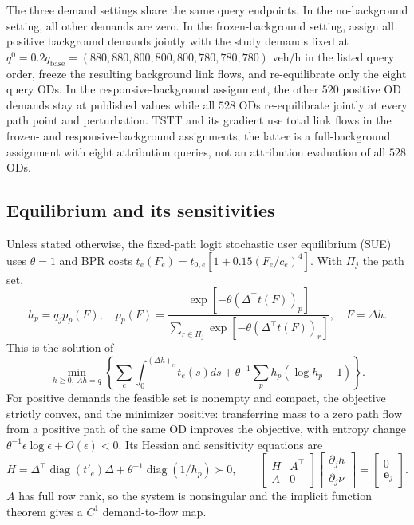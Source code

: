 The three demand settings share the same query endpoints. In the
no-background setting, all other demands are zero. In the
frozen-background setting, assign all positive
background demands jointly with the study demands fixed at
$q^0=0.2q_{\mathrm{base}}=(880,880,800,800,800,780,780,780)$ veh/h in
the listed query order, freeze the resulting background link flows, and
re-equilibrate only the eight query ODs. In the responsive-background assignment, the other $520$
positive OD demands stay at published values while all $528$ ODs
re-equilibrate jointly at every path point and perturbation. TSTT and
its gradient use total link flows in the frozen- and responsive-background assignments; the latter is a
full-background assignment with eight attribution queries, not an
attribution evaluation of all $528$ ODs.

\subsection{Equilibrium and its sensitivities}\label{supp:sue}
Unless stated otherwise, the fixed-path logit stochastic user equilibrium
(SUE) uses $\theta=1$ and BPR costs
$t_e(F_e)=t_{0,e}[1+0.15(F_e/c_e)^4]$. With $\Pi_j$ the path set,
\begin{equation}
h_p=q_jp_p(F),\quad
p_p(F)=\frac{\exp[-\theta(\Delta^\top t(F))_p]}
{\sum_{r\in\Pi_j}\exp[-\theta(\Delta^\top t(F))_r]},\quad
F=\Delta h.\label{eq:sueloading}
\end{equation}
This is the solution of
\[
\min_{h\ge0,\ Ah=q}\left\{
\sum_e\int_0^{(\Delta h)_e}t_e(s)ds+
\theta^{-1}\sum_p h_p(\log h_p-1)\right\}.
\]
For positive demands the feasible set is nonempty and compact, the
objective strictly convex, and the minimizer positive: transferring
mass to a zero path flow from a positive path of the same OD improves
the objective, with entropy change
$\theta^{-1}\epsilon\log\epsilon+O(\epsilon)<0$. Its Hessian and
sensitivity equations are
\begin{equation}
H=\Delta^\top\operatorname{diag}(t'_e)\Delta+
\theta^{-1}\operatorname{diag}(1/h_p)\succ0,\qquad
\begin{bmatrix}H&A^\top\\A&0\end{bmatrix}
\begin{bmatrix}\partial_jh\\\partial_j\nu\end{bmatrix}
=\begin{bmatrix}0\\\mathbf e_j\end{bmatrix}.
\label{eq:kkt_sensitivity}
\end{equation}
$A$ has full row rank, so the system is nonsingular and the implicit
function theorem gives a $C^1$ demand-to-flow map.

